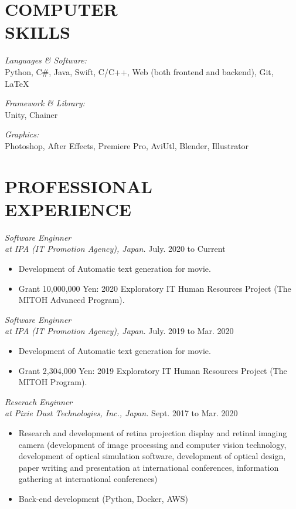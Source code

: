 \documentclass[margin]{res}
\begin{document}
\begin{resume}
\section{COMPUTER \\ SKILLS}

{\sl Languages \& Software:}\\
Python,
C\#,
Java,
Swift,
C/C++,
Web (both frontend and backend),
Git, LaTeX

{\sl Framework \& Library:}\\
Unity, Chainer

{\sl Graphics:}\\
Photoshop, After Effects, Premiere Pro, AviUtl, Blender, Illustrator

\section{PROFESSIONAL \\ EXPERIENCE}

{\sl Software Enginner \\ at IPA (IT Promotion Agency), Japan.} \hfill July. 2020 to Current \\

\begin{itemize}
  \item Development of Automatic text generation for movie.
  \item Grant 10,000,000 Yen: 2020 Exploratory IT Human Resources Project (The MITOH Advanced Program).
\end{itemize}

{\sl Software Enginner \\ at IPA (IT Promotion Agency), Japan.} \hfill July. 2019 to Mar. 2020 \\

\begin{itemize}
  \item Development of Automatic text generation for movie.
  \item Grant 2,304,000 Yen: 2019 Exploratory IT Human Resources Project (The MITOH Program).
\end{itemize}

{\sl Reserach Enginner \\ at Pixie Dust Technologies, Inc., Japan.} \hfill Sept. 2017 to Mar. 2020 \\

\begin{itemize}  \itemsep -2pt
  \item Research and development of retina projection display and retinal imaging camera (development of image processing and computer vision technology, development of optical simulation software, development of optical design, paper writing and presentation at international conferences, information gathering at international conferences)
  \item Back-end development (Python, Docker, AWS)
\end{itemize}


\end{resume}
\end{document}
